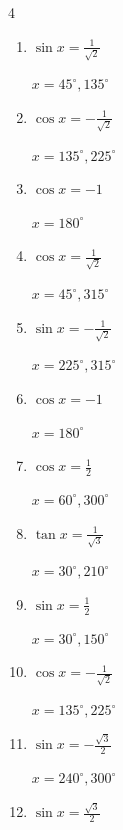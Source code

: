 \begin{multicols}{4}
\begin{enumerate}
  \item $\displaystyle \sin{x}  = \frac{1}{\sqrt{2}}$

        $\displaystyle x = 45^{\circ} , 135^{\circ}$

  \item $\displaystyle \cos{x}  = -\frac{1}{\sqrt{2}}$

        $\displaystyle x = 135^{\circ} , 225^{\circ}$

  \item $\displaystyle \cos{x}  = -1$

        $\displaystyle x = 180^{\circ}$

  \item $\displaystyle \cos{x}  = \frac{1}{\sqrt{2}}$

        $\displaystyle x = 45^{\circ} , 315^{\circ}$

  \item $\displaystyle \sin{x}  = -\frac{1}{\sqrt{2}}$

        $\displaystyle x = 225^{\circ} , 315^{\circ}$

\columnbreak %

  \item $\displaystyle \cos{x}  = -1$

        $\displaystyle x = 180^{\circ}$

  \item $\displaystyle \cos{x}  = \frac{1}{2}$

        $\displaystyle x = 60^{\circ} , 300^{\circ}$

  \item $\displaystyle \tan{x}  = \frac{1}{\sqrt{3}}$

        $\displaystyle x = 30^{\circ} , 210^{\circ}$

  \item $\displaystyle \sin{x}  = \frac{1}{2}$

        $\displaystyle x = 30^{\circ} , 150^{\circ}$

  \item $\displaystyle \cos{x}  = -\frac{1}{\sqrt{2}}$

        $\displaystyle x = 135^{\circ} , 225^{\circ}$

  \item $\displaystyle \sin{x}  = -\frac{\sqrt{3}}{2}$

        $\displaystyle x = 240^{\circ} , 300^{\circ}$

  \item $\displaystyle \sin{x}  = \frac{\sqrt{3}}{2}$


\end{enumerate}
\end{multicols}
